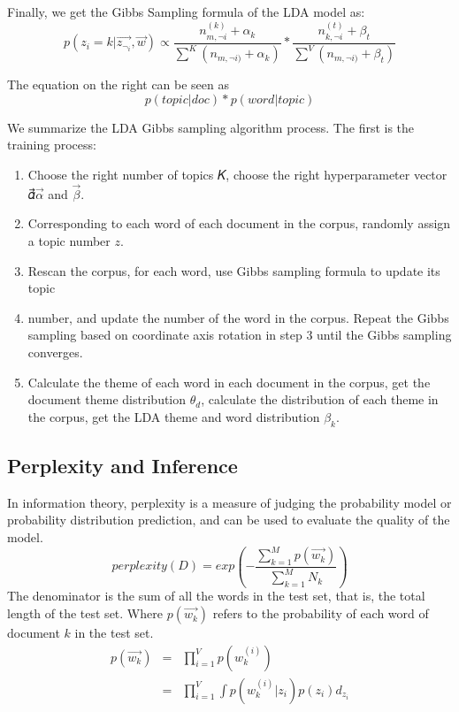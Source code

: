 Finally, we get the Gibbs Sampling formula of the LDA model as:
\[
p(z_i=k|\vec{z_{\neg_i}},\vec{w}) \propto \frac{n_{m,\neg{i}}^{(k)}+\alpha_k}{\sum^K (n_{m,\neg{i})}+\alpha_k)} *
 \frac{n_{k,\neg{i}}^{(t)}+\beta_t}{\sum^V (n_{m,\neg{i})}+\beta_t)}
\]


The equation on the right can be seen as \[
  p(topic|doc)*p(word|topic)
\]


We summarize the LDA Gibbs sampling algorithm process. The first is the training process:
\begin{enumerate}
  \item  Choose the right number of topics 𝐾, choose the right hyperparameter vector 𝛼⃗$\vec{\alpha}$ and $\vec{\beta}$.
　\item Corresponding to each word of each document in the corpus, randomly assign a topic number $z$.
　\item Rescan the corpus, for each word, use Gibbs sampling formula to update its   topic
  \item number, and update the number of the word in the corpus.
Repeat the Gibbs sampling based on coordinate axis rotation in step 3 until the Gibbs sampling converges.
  \item Calculate the theme of each word in each document in the corpus, get the document theme distribution $\theta_d$, calculate the distribution of each theme in the corpus, get the LDA theme and word distribution $\beta_k$.
\end{enumerate}

\subsection{Perplexity and Inference}

In information theory, perplexity\cite{per} is a measure of judging the probability model or probability distribution prediction, and can be used to evaluate the quality of the model.
\[
  perplexity(D) = exp(-\frac{\sum_{k=1}^{M}p(\vec{w_k})}{\sum_{k=1}^{M}N_k})
\]
The denominator is the sum of all the words in the test set, that is, the total length of the test set. Where $p(\vec{w_k})$ refers to the probability of each word of document $k$ in the test set.
\begin{eqnarray*}
  p(\vec{w_k}) &=&\prod_{i=1}^{V}p(w_k^{(i)})\\
               &=&\prod_{i=1}^{V}\int p(w_k^{(i)}|z_i)p(z_i)d_{z_i}
\end{eqnarray*}

